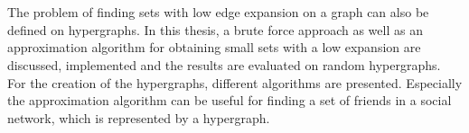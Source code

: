 \chapter{\abstractname}

The problem of finding sets with low edge expansion on a graph can also be defined on hypergraphs. %
In this thesis, a brute force approach as well as an approximation algorithm for obtaining small sets with a low expansion are discussed, implemented and the results are evaluated on random hypergraphs. For the creation of the hypergraphs, different algorithms are presented. Especially the approximation algorithm can be useful for finding a set of friends in a social network, which is represented by a hypergraph.



